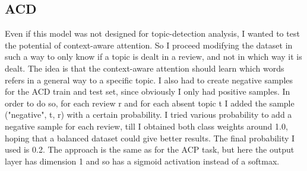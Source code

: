 \documentclass{article}
\begin{document}
        \subsection{ACD}\label{subsec:s2}
            Even if this model was not designed for topic-detection analysis, I wanted to test the potential of context-aware attention.
            So I proceed modifying the dataset in such a way to only know if a topic is dealt in a review, and not in which way it is dealt.
            The idea is that the context-aware attention should learn which words refers in a general way to a specific topic.
            I also had to create negative samples for the ACD train and test set, since obviously I only had positive samples.
            In order to do so, for each review r and for each absent topic t I added the sample ("negative", t, r) with a certain probability.
            I tried various probability to add a negative sample for each review, till I obtained both class weights around 1.0, hoping that a balanced dataset could give better results.
            The final probability I used is 0.2.
            The approach is the same as for the ACP task, but here the output layer has dimension 1 and so has a sigmoid activation instead of a softmax.
\end{document}
